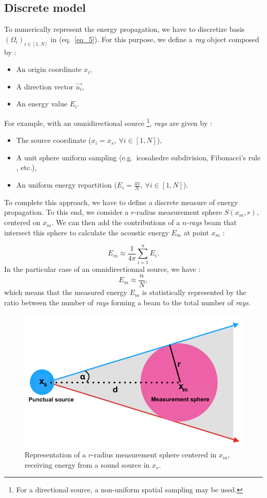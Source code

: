 \documentclass[AMA,STIX1COL]{WileyNJD-v2}
\begin{document}
\subsection{Discrete model}

To numerically represent the energy propagation, we have to discretize basis $(\Omega_i)_{i\in[1,N] }$ in (eq.~\ref{eq_5}). For this purpose, we define a \textit{ray} object composed by :
\begin{itemize}
\item An origin coordinate $x_i$,
\item A direction vector $\overrightarrow{u_i}$,
\item An energy value $E_i$.
\end{itemize}

For example, with an omnidirectional source \footnote{For a directional source, a non-uniform spatial sampling may be used.}, \textit{rays} are given by :
\begin{itemize}
\item The source coordinate ($x_i = x_s,~\forall i\in[1,N]$),
\item A unit sphere uniform sampling (e.g.~icosahedre subdivision, Fibonacci's rule \cite{fibonacci}, etc.),
\item An uniform energy repartition ($E_i = \frac{4\pi}{N},~\forall i\in[1,N]$).
\end{itemize}

To complete this approach, we have to define a discrete measure of energy propagation. To this end, we consider a $r$-radius measurement sphere $S(x_m, r)$, centered on $x_m$.  We can then add the contributions of a $n$-\textit{rays}  beam that intersect this sphere to calculate the acoustic energy $E_m$ at point $x_m$ :

\begin{equation}
E_m \approx  \frac{1}{4\pi}  \sum_{i=1}^n E_i.
\end{equation}
In the particular case of an omnidirectionnal source, we have : 
\begin{equation}
E_m \approx  \frac{n}{N},
\label{eq_7}
\end{equation}
which means that the measured energy $E_m$ is statistically represented by the ratio between the number of \textit{rays} forming a beam to the total number of \textit{rays}.

\begin{figure}[t]
\centering
	\includegraphics[width=0.6\linewidth]{schema_rayon}
	\caption{Representation of a $r$-radius measurement sphere centered in $x_m$, receiving energy from a sound source in $x_s$.}
	\label{schema_rayon}
\end{figure}
\end{document}

